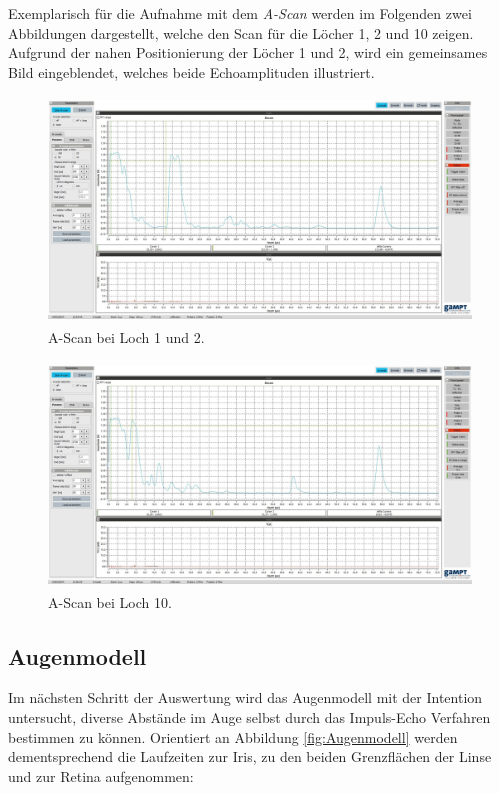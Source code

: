 \noindent Exemplarisch für die Aufnahme mit dem \emph{A-Scan} werden im Folgenden zwei Abbildungen dargestellt, welche den Scan 
für die Löcher 1, 2 und 10 zeigen. Aufgrund der nahen Positionierung der Löcher 1 und 2, wird ein gemeinsames Bild eingeblendet, 
welches beide Echoamplituden illustriert.

\begin{figure}[H]
    \centering
    \includegraphics[height=6cm]{content/US2_Loch_1_2_top.jpg}
    \caption{A-Scan bei Loch 1 und 2.}
    \label{fig:Loch12}
\end{figure}

\begin{figure}[H]
    \centering 
    \includegraphics[height=6cm]{content/US2_Loch_10_top.jpg}
    \caption{A-Scan bei Loch 10.}
    \label{fig:Loch10}
\end{figure}

\subsection{Augenmodell}

\noindent Im nächsten Schritt der Auswertung wird das Augenmodell mit der Intention untersucht, diverse Abstände im Auge selbst durch 
das Impuls-Echo Verfahren bestimmen zu können. Orientiert an Abbildung \ref{fig:Augenmodell} werden dementsprechend die Laufzeiten zur Iris, 
zu den beiden Grenzflächen der Linse und zur Retina aufgenommen:

